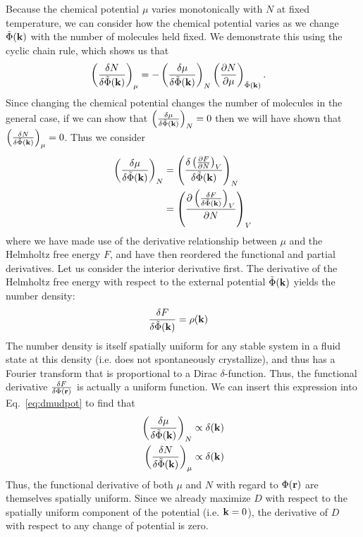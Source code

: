 Because the chemical potential $\mu$ varies monotonically with $N$ at fixed
temperature, we can consider how the chemical potential varies as we change
$\tilde\Phi(\mathbf{k})$ with the number of molecules held fixed. We demonstrate this using the
cyclic chain rule, which shows us that
\begin{align}
    \left(\frac{\delta N}{\delta \tilde\Phi(\mathbf{k})}\right)_{\mu} &=
    -\left(\frac{\delta \mu}{\delta \tilde\Phi(\mathbf{k})}\right)_{N}
    \left(\frac{\partial N}{\partial \mu}\right)_{\tilde\Phi(\mathbf{k})}.
\end{align}
Since changing the chemical potential changes the number of molecules in the general case, if we can show that $\left(\frac{\delta \mu}{\delta \tilde\Phi(\mathbf{k})}\right)_{N}=0$ then we will have shown that $\left(\frac{\delta N}{\delta \tilde\Phi(\mathbf{k})}\right)_{\mu}=0$.  Thus we consider
\begin{align}
    \left(\frac{\delta \mu}{\delta \tilde\Phi(\mathbf{k})}\right)_N
    &= \left(\frac{\delta \left(\frac{\partial F}{\partial N}\right)_{V}}{\delta \tilde\Phi(\mathbf{k})}\right)_N
    \\
    &= \left(\frac{\partial \left(\frac{\delta F}{\delta \tilde\Phi(\mathbf{k})}\right)_{V}}{\partial N}\right)_{V}
    \label{eq:dmudpot}
\end{align}
where we have made use of the derivative relationship between $\mu$ and the Helmholtz free energy $F$, and have then reordered the functional and partial derivatives.
Let us consider the interior derivative first.  The derivative of the Helmholtz free energy with respect to the external potential $\tilde\Phi(\mathbf{k})$ yields the number density:
\begin{align}
    \frac{\delta F}{\delta \tilde\Phi(\mathbf{k})} &= \rho(\mathbf{k})
\end{align}
The number density is itself spatially uniform for any stable system in a fluid state at this density (i.e. does not spontaneously crystallize), and thus has a Fourier transform that is proportional to a Dirac $\delta$-function.  Thus, the functional derivative $\frac{\delta F}{\delta \Phi(\mathbf{r})}$ is actually a uniform function.
We can insert this expression into Eq.~\ref{eq:dmudpot} to find that
\begin{align}
    \left(\frac{\delta \mu}{\delta \tilde\Phi(\mathbf{k})}\right)_N &\propto \delta(\mathbf{k}) \\
    \left(\frac{\delta N}{\delta \tilde\Phi(\mathbf{k})}\right)_\mu &\propto \delta(\mathbf{k})
\end{align}
Thus, the functional derivative of both $\mu$ and $N$ with regard to $\Phi(\mathbf{r})$ are themselves spatially uniform.  Since we already maximize $D$ with respect to the spatially uniform component of the potential (i.e. $\mathbf{k}=0$), the derivative of $D$ with respect to any change of potential is zero.

